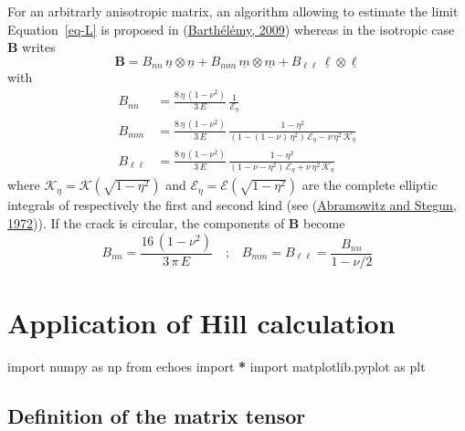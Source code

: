 \documentclass[
  letterpaper,
  DIV=11,
  numbers=noendperiod]{scrreprt}
\newenvironment{Shaded}{\begin{snugshade}}{\end{snugshade}}
\newcommand{\ImportTok}[1]{#1}
\newcommand{\NormalTok}[1]{#1}
\newcommand{\OperatorTok}[1]{\textcolor[rgb]{0.81,0.36,0.00}{\textbf{#1}}}
\begin{document}
For an arbitrarly anisotropic matrix, an algorithm allowing to estimate
the limit Equation~\ref{eq-L} is proposed in
(\protect\hyperlink{ref-barthelemy2009c}{Barthélémy, 2009}) whereas in
the isotropic case \({\mathbf{\boldsymbol{{B}}}}\) writes \[
{\mathbf{\boldsymbol{{B}}}}=
B_{nn}\,{\underline{{n}}}\otimes{\underline{{n}}}
+
B_{mm}\,{\underline{{m}}}\otimes{\underline{{m}}}
+
B_{\ell\ell}\,{\underline{{\ell}}}\otimes{\underline{{\ell}}}
\] with \[\begin{aligned}
B_{nn}&=\frac{8\,\eta\,(1-\nu^2)}{3\,E}\,
\frac{1}{\mathcal{E}_\eta}\label{eq:Bnn}\\
B_{mm}&=\frac{8\,\eta\,(1-\nu^2)}{3\,E}\,
\frac{1-\eta^2}{\left(1-(1-\nu)\,\eta^2\right)
\,\mathcal{E}_\eta-\nu\,\eta^2\,\mathcal{K}_\eta}\\
B_{\ell\ell}&=\frac{8\,\eta\,(1-\nu^2)}{3\,E}\,
\frac{1-\eta^2}{(1-\nu-\eta^2)\,\mathcal{E}_\eta+\nu\,\eta^2\,\mathcal{K}_\eta}
\end{aligned}\] where \(\mathcal{K}_\eta=\mathcal{K}(\sqrt{1-\eta^2})\)
and \(\mathcal{E}_\eta=\mathcal{E}(\sqrt{1-\eta^2})\) are the complete
elliptic integrals of respectively the first and second kind (see
(\protect\hyperlink{ref-abramowitz1972}{Abramowitz and Stegun, 1972})).
If the crack is circular, the components of
\({\mathbf{\boldsymbol{{B}}}}\) become \[
B_{nn}=\frac{16\,(1-\nu^2)}{3\,\pi\,E}
\quad\textrm{;}\quad
B_{mm}=B_{\ell\ell}=\frac{B_{nn}}{1-\nu/2}
\]

\hypertarget{application-of-hill-calculation}{%
\section{Application of Hill
calculation}\label{application-of-hill-calculation}}

\begin{Shaded}
\begin{Highlighting}[]
\ImportTok{import}\NormalTok{ numpy }\ImportTok{as}\NormalTok{ np}
\ImportTok{from}\NormalTok{ echoes }\ImportTok{import} \OperatorTok{*}
\ImportTok{import}\NormalTok{ matplotlib.pyplot }\ImportTok{as}\NormalTok{ plt}
\end{Highlighting}
\end{Shaded}

\hypertarget{definition-of-the-matrix-tensor}{%
\subsection{Definition of the matrix
tensor}\label{definition-of-the-matrix-tensor}}
\end{document}
